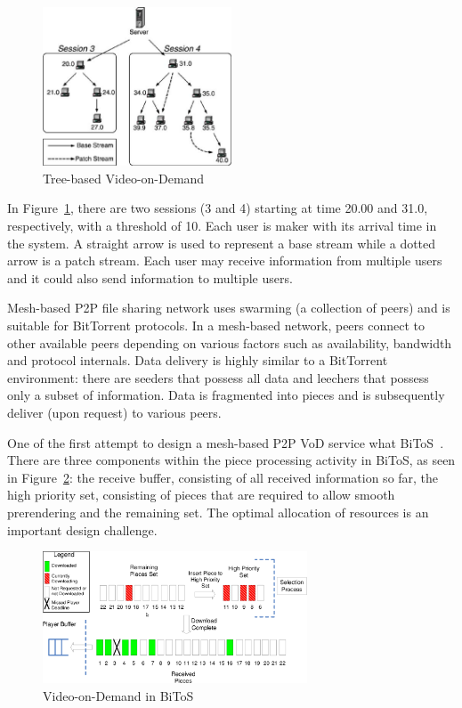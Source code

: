 \begin{figure}
  \centering
  \includegraphics[width=0.5\textwidth]{src/img/p2p-systems/tree-based-vod}
  \caption{Tree-based Video-on-Demand}
  \label{fig:p2p-systems:tree-based-vod}
\end{figure}

In Figure~\ref{fig:p2p-systems:tree-based-vod}, there are two sessions (3 and 4) starting
at time 20.00 and
31.0, respectively, with a threshold of 10. Each user is maker with its
arrival time in the system. A straight arrow is used to represent a base
stream while a dotted arrow is a patch stream. Each user may receive
information from multiple users and it could also send information to multiple
users.

Mesh-based P2P file sharing network uses swarming (a collection of peers) and
is suitable for BitTorrent protocols. In a mesh-based network, peers connect
to other available peers depending on various factors such as availability,
bandwidth and protocol internals. Data delivery is highly similar to a
BitTorrent environment: there are seeders that possess all data and leechers
that possess only a subset of information. Data is fragmented into pieces and
is subsequently deliver (upon request) to various peers.

One of the first attempt to design a mesh-based P2P VoD service what
BiToS~\cite{bitos}. There are three components within the piece processing
activity in BiToS, as seen in Figure~\ref{fig:p2p-systems:bitos-vod}: the receive buffer, consisting of
all received information so far, the high priority set, consisting of pieces
that are required to allow smooth prerendering and the remaining set. The
optimal allocation of resources is an important design challenge.

\begin{figure}
  \centering
  \includegraphics[width=0.7\textwidth]{src/img/p2p-systems/bitos-vod}
  \caption{Video-on-Demand in BiToS}
  \label{fig:p2p-systems:bitos-vod}
\end{figure}

